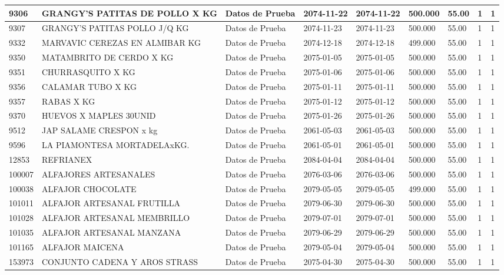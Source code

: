\documentclass[a4paper,12pt]{article}
\begin{document}
\begin{landscape}
\begin{longtable}{|p{4cm}|p{2.5cm}|p{2.5cm}|p{1.8cm}|p{1.8cm}|p{1cm}|p{1cm}|p{3cm}|p{3cm}||}
9306 & GRANGY'S PATITAS DE POLLO X KG & Datos de Prueba & 2074-11-22 & 2074-11-22 & 500.000 & 55.00 & 1 & 1 \\ \hline 
9307 & GRANGY'S PATITAS POLLO J/Q KG & Datos de Prueba & 2074-11-23 & 2074-11-23 & 500.000 & 55.00 & 1 & 1 \\ \hline 
9332 & MARVAVIC CEREZAS EN ALMIBAR KG & Datos de Prueba & 2074-12-18 & 2074-12-18 & 499.000 & 55.00 & 1 & 1 \\ \hline 
9350 & MATAMBRITO DE CERDO X KG & Datos de Prueba & 2075-01-05 & 2075-01-05 & 500.000 & 55.00 & 1 & 1 \\ \hline 
9351 & CHURRASQUITO X KG & Datos de Prueba & 2075-01-06 & 2075-01-06 & 500.000 & 55.00 & 1 & 1 \\ \hline 
9356 & CALAMAR TUBO X KG & Datos de Prueba & 2075-01-11 & 2075-01-11 & 500.000 & 55.00 & 1 & 1 \\ \hline 
9357 & RABAS X KG & Datos de Prueba & 2075-01-12 & 2075-01-12 & 500.000 & 55.00 & 1 & 1 \\ \hline 
9370 & HUEVOS X MAPLES 30UNID & Datos de Prueba & 2075-01-26 & 2075-01-26 & 500.000 & 55.00 & 1 & 1 \\ \hline 
9512 & JAP SALAME CRESPON  x kg & Datos de Prueba & 2061-05-03 & 2061-05-03 & 500.000 & 55.00 & 1 & 1 \\ \hline 
9596 & LA PIAMONTESA MORTADELAxKG. & Datos de Prueba & 2061-05-01 & 2061-05-01 & 500.000 & 55.00 & 1 & 1 \\ \hline 
12853 & REFRIANEX & Datos de Prueba & 2084-04-04 & 2084-04-04 & 500.000 & 55.00 & 1 & 1 \\ \hline 
100007 & ALFAJORES ARTESANALES & Datos de Prueba & 2076-03-06 & 2076-03-06 & 500.000 & 55.00 & 1 & 1 \\ \hline 
100038 & ALFAJOR CHOCOLATE & Datos de Prueba & 2079-05-05 & 2079-05-05 & 499.000 & 55.00 & 1 & 1 \\ \hline 
101011 & ALFAJOR ARTESANAL FRUTILLA & Datos de Prueba & 2079-06-30 & 2079-06-30 & 500.000 & 55.00 & 1 & 1 \\ \hline 
101028 & ALFAJOR ARTESANAL MEMBRILLO & Datos de Prueba & 2079-07-01 & 2079-07-01 & 500.000 & 55.00 & 1 & 1 \\ \hline 
101035 & ALFAJOR ARTESANAL MANZANA & Datos de Prueba & 2079-06-29 & 2079-06-29 & 500.000 & 55.00 & 1 & 1 \\ \hline 
101165 & ALFAJOR MAICENA & Datos de Prueba & 2079-05-04 & 2079-05-04 & 500.000 & 55.00 & 1 & 1 \\ \hline 
153973 & CONJUNTO CADENA Y AROS STRASS & Datos de Prueba & 2075-04-30 & 2075-04-30 & 500.000 & 55.00 & 1 & 1 \\ \hline 

\end{longtable}
\end{landscape}
\end{document}
